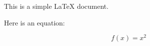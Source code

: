 \documentclass{article}
\begin{document}
This is a simple LaTeX document.

Here is an equation:

\begin{equation}
  f(x) = x^2
\end{equation}
\end{document}
